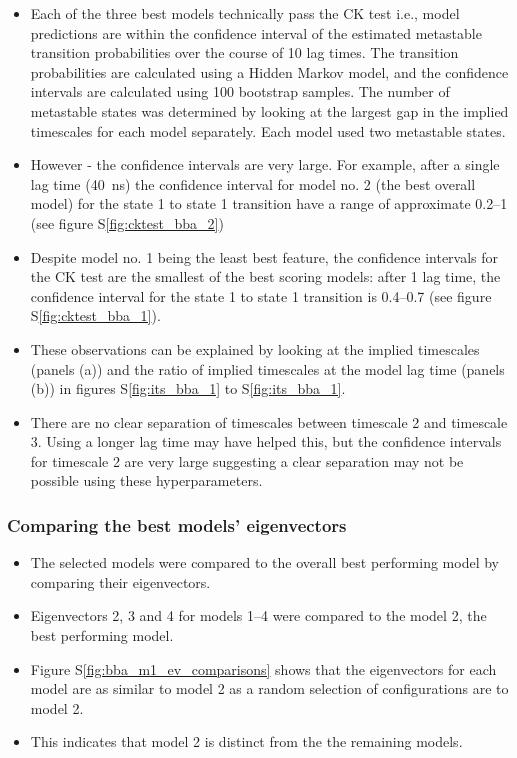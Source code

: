 \documentclass[journal=jacsat,manuscript=article]{achemso}
\newcommand*\sref[1]{%
    S\ref{#1}}
\begin{document}
\begin{itemize}


    \item Each of the three best models technically pass the CK test i.e., model predictions are within the confidence interval of the estimated metastable transition probabilities over the course of 10 lag times. The transition probabilities are calculated using a Hidden Markov model, and the confidence intervals are calculated using 100 bootstrap samples. The number of metastable states was determined by looking at the largest gap in the implied timescales for each model separately. Each model used two metastable states. 
    \item However - the confidence intervals are very large.  For example, after a single lag time (\SI{40}{\nano\second}) the confidence interval for model no. 2 (the best overall model) for the state 1 to state 1 transition have a range of approximate \numrange{0.2}{1} (see figure \sref{fig:cktest_bba_2})
    \item Despite model no. 1  being the least best feature, the confidence intervals for the CK test are the smallest of the best scoring models: after 1 lag time, the confidence interval for the state 1 to state 1 transition is \numrange[range-phrase = --]{0.4}{0.7}  (see figure \sref{fig:cktest_bba_1}).  
    \item These observations can be explained by looking at the implied timescales (panels (a)) and the ratio of implied timescales at the model lag time (panels (b)) in figures \sref{fig:its_bba_1} to \sref{fig:its_bba_1}. 
    \item There are no clear separation of timescales between timescale 2 and timescale 3.  Using a longer lag time may have helped this, but the confidence intervals for timescale 2 are very large suggesting a clear separation may not be possible using these hyperparameters. 
\end{itemize}

\subsubsection{Comparing the best models' eigenvectors}

\begin{itemize}
    \item The selected models were compared to the overall best performing model by comparing their eigenvectors.  
    \item Eigenvectors 2, 3 and 4 for models \numrange{1}{4} were compared to the model 2, the best performing model.  
    \item Figure \sref{fig:bba_m1_ev_comparisons} shows that the eigenvectors for each model are as similar to model 2 as a random selection of configurations are to model 2. 
    \item This indicates that model 2 is distinct from the the remaining models.  
\end{itemize}
\end{document}
